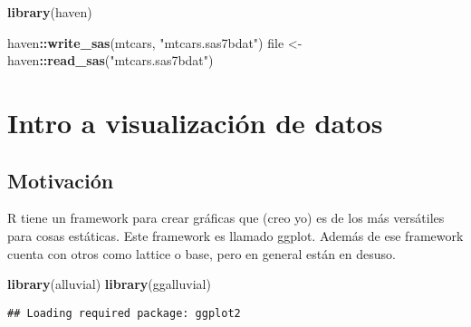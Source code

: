\documentclass[]{book}
\newenvironment{Shaded}{\begin{snugshade}}{\end{snugshade}}
\newcommand{\KeywordTok}[1]{\textcolor[rgb]{0.13,0.29,0.53}{\textbf{#1}}}
\newcommand{\NormalTok}[1]{#1}
\newcommand{\OperatorTok}[1]{\textcolor[rgb]{0.81,0.36,0.00}{\textbf{#1}}}
\newcommand{\StringTok}[1]{\textcolor[rgb]{0.31,0.60,0.02}{#1}}
\begin{document}
\begin{Shaded}
\begin{Highlighting}[]
\KeywordTok{library}\NormalTok{(haven)}

\NormalTok{haven}\OperatorTok{::}\KeywordTok{write_sas}\NormalTok{(mtcars, }\StringTok{"mtcars.sas7bdat"}\NormalTok{)}
\NormalTok{file <-}\StringTok{ }\NormalTok{haven}\OperatorTok{::}\KeywordTok{read_sas}\NormalTok{(}\StringTok{"mtcars.sas7bdat"}\NormalTok{)}
\end{Highlighting}
\end{Shaded}

\hypertarget{intro-a-visualizaciuxf3n-de-datos}{%
\chapter{Intro a visualización de datos}\label{intro-a-visualizaciuxf3n-de-datos}}

\hypertarget{motivaciuxf3n}{%
\section{Motivación}\label{motivaciuxf3n}}

R tiene un framework para crear gráficas que (creo yo) es de los más versátiles para cosas estáticas. Este framework es llamado ggplot. Además de ese framework cuenta con otros como lattice o base, pero en general están en desuso.

\begin{Shaded}
\begin{Highlighting}[]
\KeywordTok{library}\NormalTok{(alluvial)}
\KeywordTok{library}\NormalTok{(ggalluvial)}
\end{Highlighting}
\end{Shaded}

\begin{verbatim}
## Loading required package: ggplot2
\end{verbatim}
\end{document}
